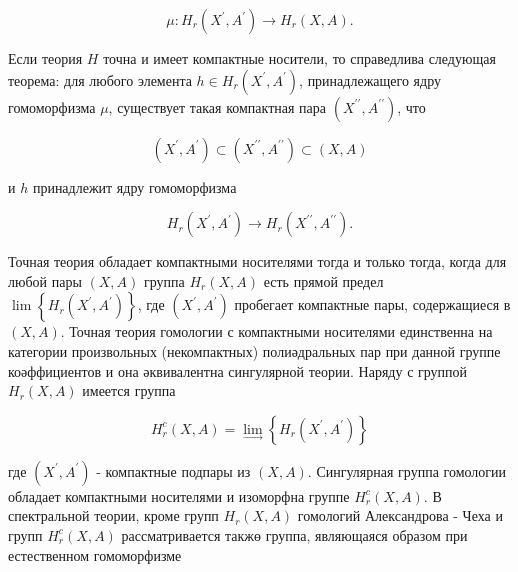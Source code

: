 \documentclass[10pt]{article}
\begin{document}
\[

\mu: H_{r}\left(X^{\prime}, A^{\prime}\right) \longrightarrow H_{r}(X, A) .

\]



Если теория $H$ точна и имеет компактные носители, то справедлива следующая теорема: для любого элемента $h \in H_{r}\left(X^{\prime}, A^{\prime}\right)$, принадлежащего ядру гомоморфизма $\mu$, существует такая компактная пара $\left(X^{\prime \prime}, A^{\prime \prime}\right)$, что



\[

\left(X^{\prime}, A^{\prime}\right) \subset\left(X^{\prime \prime}, A^{\prime \prime}\right) \subset(X, A)

\]



и $h$ принадлежит ядру гомоморфизма



\[

H_{r}\left(X^{\prime}, A^{\prime}\right) \longrightarrow H_{r}\left(X^{\prime \prime}, A^{\prime \prime}\right) .

\]



Точная теория обладает компактными носителями тогда и только тогда, когда для любой пары $(X, A)$ группа $H_{r}(X, A)$ есть прямой предел $\lim \left\{H_{r}\left(X^{\prime}, A^{\prime}\right)\right\}$, где $\left(X^{\prime}, A^{\prime}\right)$ пробегает компактные пары, содержащиеся в $(X, A)$. Точная теория гомологии с компактными носителями единственна на категории произвольных (некомпактных) полиәдральных пар при данной группе коәффициентов и она әквивалентна сингулярной теории. Наряду с группой $H_{r}(X, A)$ имеется группа



\[

H_{r}^{c}(X, A)=\lim _{\longrightarrow}\left\{H_{r}\left(X^{\prime}, A^{\prime}\right)\right\}

\]



где $\left(X^{\prime}, A^{\prime}\right)$ - компактные подпары из $(X, A)$. Сингулярная группа гомологии обладает компактными носителями и изоморфна группе $H_{r}^{c}(X, A)$. В спектральной теории, кроме групп $H_{r}(X, A)$ гомологий Александрова - Чеха и групп $H_{r}^{c}(X, A)$ рассматривается такжө группа, являющаяся образом при естественном гомоморфизме
\end{document}
